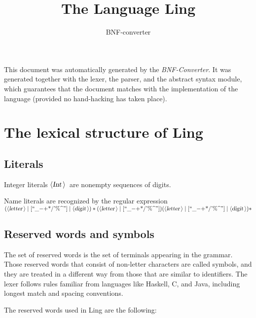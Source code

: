 \documentclass[a4paper,11pt]{article}
\author{BNF-converter}
\title{The Language Ling}
\begin{document}
\maketitle

\newcommand{\emptyP}{\mbox{$\epsilon$}}
\newcommand{\terminal}[1]{\mbox{{\texttt {#1}}}}
\newcommand{\nonterminal}[1]{\mbox{$\langle \mbox{{\sl #1 }} \! \rangle$}}
\newcommand{\arrow}{\mbox{::=}}
\newcommand{\delimit}{\mbox{$|$}}
\newcommand{\reserved}[1]{\mbox{{\texttt {#1}}}}
\newcommand{\literal}[1]{\mbox{{\texttt {#1}}}}
\newcommand{\symb}[1]{\mbox{{\texttt {#1}}}}

This document was automatically generated by the {\em BNF-Converter}. It was generated together with the lexer, the parser, and the abstract syntax module, which guarantees that the document matches with the implementation of the language (provided no hand-hacking has taken place).

\section*{The lexical structure of Ling}

\subsection*{Literals}
Integer literals \nonterminal{Int}\ are nonempty sequences of digits.




Name literals are recognized by the regular expression
\(({\nonterminal{letter}} \mid [\mbox{``\_{$-$}{$+$}*/'\%{\textasciicircum}''}] \mid {\nonterminal{digit}})* ({\nonterminal{letter}} \mid [\mbox{``\_{$-$}{$+$}*/'\%{\textasciicircum}''}]) ({\nonterminal{letter}} \mid [\mbox{``\_{$-$}{$+$}*/'\%{\textasciicircum}''}] \mid {\nonterminal{digit}})*\)


\subsection*{Reserved words and symbols}
The set of reserved words is the set of terminals appearing in the grammar. Those reserved words that consist of non-letter characters are called symbols, and they are treated in a different way from those that are similar to identifiers. The lexer follows rules familiar from languages like Haskell, C, and Java, including longest match and spacing conventions.

The reserved words used in Ling are the following: \\
\end{document}
